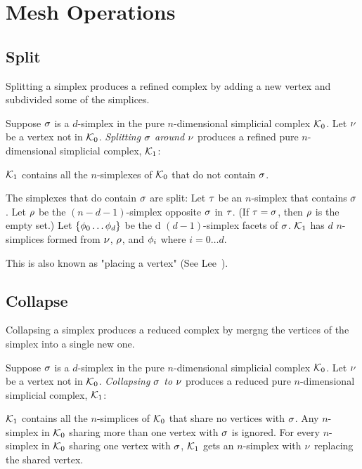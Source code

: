 
\section{Mesh Operations}
\label{sec:mesh-operations}

\subsection{Split}

Splitting a simplex produces a refined complex by adding a new vertex
and subdivided some of the simplices.


Suppose $\sigma$ is a $d$-simplex
in the pure $n$-dimensional simplicial complex $\mathcal{K}_0$.
Let $\nu$ be a vertex not in $\mathcal{K}_0$.
{\it Splitting $\sigma$ around $\nu$}
produces a refined pure $n$-dimensional simplicial complex, $\mathcal{K}_1$:

$\mathcal{K}_1$ contains all the  $n$-simplexes of $\mathcal{K}_0$
that do not contain $\sigma$.

The simplexes that do contain $\sigma$ are split:
Let $\tau$ be an $n$-simplex that contains $\sigma$.
Let $\rho$ be the $(n-d-1)$-simplex opposite $\sigma$
in $\tau$.
(If $\tau = \sigma$, then $\rho$ is the empty set.)
Let $\{ \phi_0 \ldots \phi_d \}$ be the
d $(d-1)$-simplex facets of $\sigma$.
$\mathcal{K}_1$ has
$d$ $n$-simplices formed from
$\nu$, $\rho$, and
$\phi_i$ where $i=0 \ldots d$.

This is also known as "placing a vertex" 
(See Lee~\cite[sec.~17.2]{Lee:2004:Subdivisions}).

\subsection{Collapse}

Collapsing a simplex produces a reduced complex by mergng
the vertices of the simplex into a single new one.

Suppose $\sigma$ is a $d$-simplex
in the pure $n$-dimensional simplicial complex $\mathcal{K}_0$.
Let $\nu$ be a vertex not in $\mathcal{K}_0$.
{\it Collapsing $\sigma$ to $\nu$}
produces a reduced pure $n$-dimensional simplicial complex, $\mathcal{K}_1$:

$\mathcal{K}_1$ contains all the
$n$-simplices of $\mathcal{K}_0$ that share no vertices with $\sigma$.
Any $n$-simplex in $\mathcal{K}_0$ sharing more than one vertex
with $\sigma$ is ignored.
For every $n$-simplex in $\mathcal{K}_0$ sharing one vertex with $\sigma$,
$\mathcal{K}_1$ gets an $n$-simplex with $\nu$ replacing the
shared vertex.


